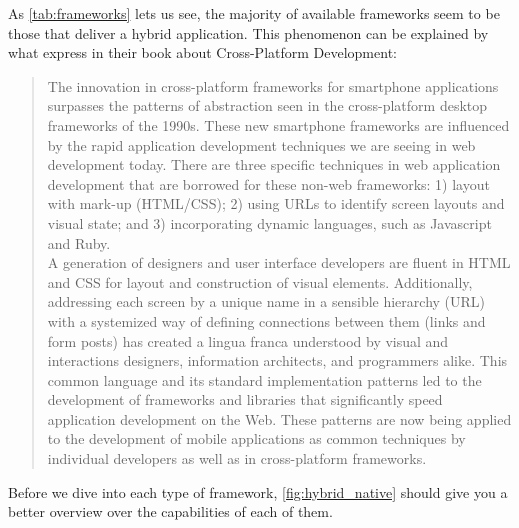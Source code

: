 As \autoref{tab:frameworks} lets us see, the majority of available frameworks seem to be those that deliver a hybrid application. This phenomenon can be explained by what \citeauthor{allen:2010} express in their book about Cross-Platform Development:
\begin{quotation}
The innovation in cross-platform frameworks for smartphone applications surpasses the patterns of abstraction seen in the cross-platform desktop frameworks of the 1990s. These new smartphone frameworks are influenced by the rapid application development techniques we are seeing in web development today. There are three specific techniques in web application development that are borrowed for these non-web frameworks: 1) layout with mark-up (HTML/CSS); 2) using URLs to identify screen layouts and visual state; and 3) incorporating dynamic languages, such as Javascript and Ruby.\\

A generation of designers and user interface developers are fluent in HTML and CSS for layout and construction of visual elements. Additionally, addressing each screen by a unique name in a sensible hierarchy (URL) with a systemized way of defining connections between them (links and form posts) has created a lingua franca understood by visual and interactions designers, information architects, and programmers alike. This common language and its standard implementation patterns led to the development of frameworks and libraries that significantly speed application development on the Web. These patterns are now being applied to the development of mobile applications as common techniques by individual developers as well as in cross-platform frameworks.
\cite[p. 23]{allen:2010}
\end{quotation}
Before we dive into each type of framework, \autoref{fig:hybrid_native} should give you a better overview over the capabilities of each of them.\\

